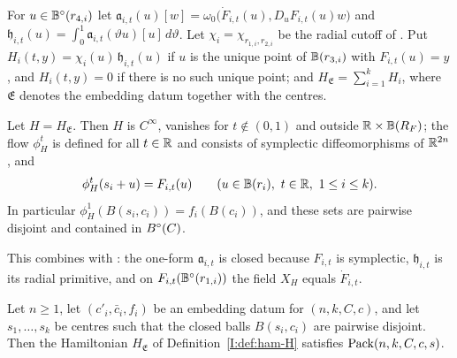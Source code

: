 \begin{definition}\label{I:def:ham-H}
For $u\in\mathbb{B}^\circ(r_{4,i})$ let $\mathfrak a_{i,t}(u)[w]=\omega_0\big(\dot F_{i,t}(u),D_uF_{i,t}(u)w\big)$ and
$\mathfrak h_{i,t}(u)=\int_0^1\mathfrak a_{i,t}(\vartheta u)[u]\,d\vartheta$. Let $\chi_i=\chi_{r_{1,i},r_{2,i}}$ be the radial
cutoff of . Put $H_i(t,y)=\chi_i(u)\,\mathfrak h_{i,t}(u)$ if $u$ is the unique point of
$\mathbb{B}(r_{3,i})$ with $F_{i,t}(u)=y$, and $H_i(t,y)=0$ if there is no such unique point; and $H_{\mathfrak E}=\sum_{i=1}^kH_i$,
where $\mathfrak E$ denotes the embedding datum together with the centres.
\end{definition}

\begin{theorem}\label{I:thm:ham-flow}
Let $H=H_{\mathfrak E}$. Then $H$ is $C^\infty$, vanishes for $t\notin(0,1)$ and outside $\mathbb{R}\times\mathbb{B}(R_F)$; the flow
$\phi^t_H$ is defined for all $t\in\mathbb{R}$ and consists of symplectic diffeomorphisms of $\mathbb{R}^{2n}$, and
\[
 \phi^t_H(s_i+u)=F_{i,t}(u)\qquad(u\in\EB(r_i),\ t\in\R,\ 1\le i\le k).
\]
In particular $\phi^1_H(B(s_i,c_i))=f_i(B(c_i))$, and these sets are pairwise disjoint and contained in $B^{\circ}(C)$.
\end{theorem}

This combines  with : the one-form $\mathfrak a_{i,t}$ is closed
because $F_{i,t}$ is symplectic, $\mathfrak h_{i,t}$ is its radial primitive, and on $F_{i,t}(\mathbb{B}^\circ(r_{1,i}))$ the field
$X_H$ equals $\dot F_{i,t}$.

\begin{proposition}\label{I:prop:ham-end}
Let $n\ge1$, let $(c'_i,\bar c_i,f_i)$ be an embedding datum for $(n,k,C,c)$, and let $s_1,\dots,s_k$ be centres such
that the closed balls $B(s_i,c_i)$ are pairwise disjoint. Then the Hamiltonian $H_{\mathfrak E}$ of
Definition~\ref{I:def:ham-H} satisfies $\mathrm{Pack}(n,k,C,c,s)$.
\end{proposition}


